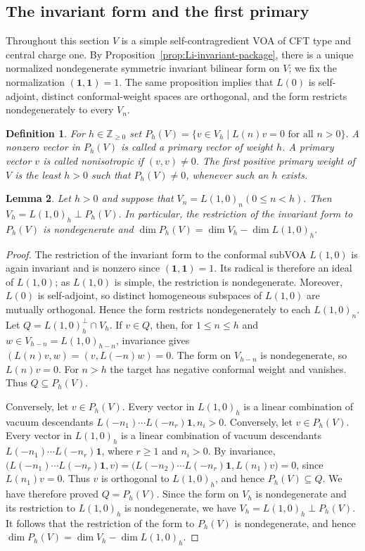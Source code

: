\documentclass[10pt,a4paper]{amsart}
\numberwithin{equation}{section} \newtheorem{thm}{Theorem}[section] \newtheorem{lem}[thm]{Lemma} \newtheorem{ex}[thm]{Example} \newtheorem{prop}[thm]{Proposition} \newtheorem{cor}[thm]{Corollary} \newtheorem{defi}[thm]{Definition} \newtheorem{rmk}[thm]{Remark} \newtheorem{notation}[thm]{Notation}
\newcommand{\one}{\mathbf{1}}
\def\Z{\mathbb{Z}} \def\N{\mathbb{N}} \def\A{\mathbb{A}} \def\C{\mathbb{C}} \def\R{\mathbb{R}} \def\Q{\mathbb{Q}} \def\F{\mathbb{F}}
\begin{document}
\subsection{The invariant form and the first primary}

Throughout this section $V$ is a simple self-contragredient VOA of CFT type and central charge one. By Proposition~\ref{prop:Li-invariant-package}, there is a unique normalized nondegenerate symmetric invariant bilinear form on $V$; we fix the normalization $(\one,\one)=1$. The same proposition implies that $L(0)$ is self-adjoint, distinct conformal-weight spaces are orthogonal, and the form restricts nondegenerately to every $V_n$.

\begin{defi}
For $h\in\Z_{\ge0}$ set \(P_h(V)=\{v\in V_h\mid L(n)v=0\text{ for all }n>0\}.\) A nonzero vector in \(P_h(V)\) is called a primary vector of weight $h$. A primary vector $v$ is called nonisotropic if \((v,v)\ne0\). The first positive primary weight of $V$ is the least $h>0$ such that \(P_h(V)\ne0\), whenever such an $h$ exists.
\end{defi}

\begin{lem}\label{lem:primary-complement}
Let $h>0$ and suppose that \(V_n=L(1,0)_n(0\le n<h).\) Then \(V_h=L(1,0)_h\mathbin{\perp}P_h(V).\) In particular, the restriction of the invariant form to $P_h(V)$ is nondegenerate and \(\dim P_h(V)=\dim V_h-\dim L(1,0)_h.\)
\end{lem}

\begin{proof}
The restriction of the invariant form to the conformal subVOA \(L(1,0)\) is again invariant and is nonzero since \((\one,\one)=1\). Its radical is therefore an ideal of \(L(1,0)\); as \(L(1,0)\) is simple, the restriction is nondegenerate. Moreover, \(L(0)\) is self-adjoint, so distinct homogeneous subspaces of \(L(1,0)\) are mutually orthogonal. Hence the form restricts nondegenerately to each \(L(1,0)_n\). Let $Q=L(1,0)_h^\perp\cap V_h$. If $v\in Q$, then, for $1\le n\le h$ and $w\in V_{h-n}=L(1,0)_{h-n}$, invariance gives \((L(n)v,w)=(v,L(-n)w)=0.\) The form on $V_{h-n}$ is nondegenerate, so $L(n)v=0$. For $n>h$ the target has negative conformal weight and vanishes. Thus $Q\subseteq P_h(V)$.

Conversely, let $v\in P_h(V)$. Every vector in $L(1,0)_h$ is a linear combination of vacuum descendants \(L(-n_1)\cdots L(-n_r)\one,n_i>0.\) Conversely, let \(v\in P_h(V)\). Every vector in \(L(1,0)_h\) is a linear combination of vacuum descendants \(L(-n_1)\cdots L(-n_r)\one\), where \(r\ge1\) and \(n_i>0\). By invariance, \(\bigl(L(-n_1)\cdots L(-n_r)\one,v\bigr)=\bigl(L(-n_2)\cdots L(-n_r)\one,L(n_1)v\bigr)=0\), since \(L(n_1)v=0\). Thus \(v\) is orthogonal to \(L(1,0)_h\), and hence \(P_h(V)\subseteq Q\). We have therefore proved $ Q=P_h(V). $ Since the form on \(V_h\) is nondegenerate and its restriction to \(L(1,0)_h\) is nondegenerate, we have $ V_h=L(1,0)_h\mathbin{\perp}P_h(V). $ It follows that the restriction of the form to \(P_h(V)\) is nondegenerate, and hence $ \dim P_h(V)=\dim V_h-\dim L(1,0)_h. $
\end{proof}
\end{document}
